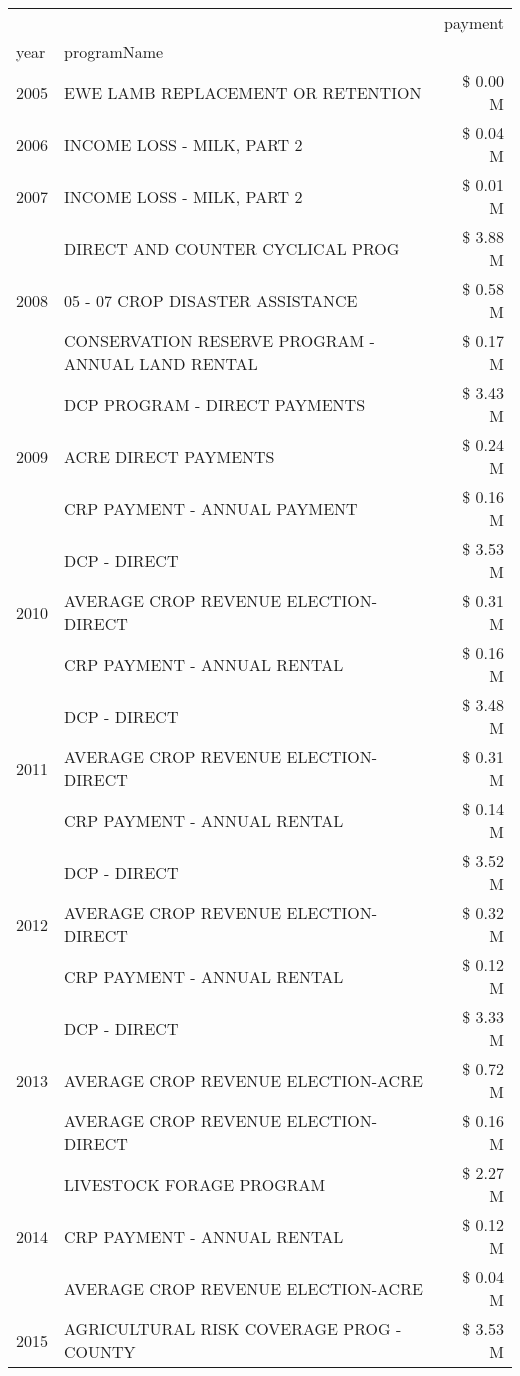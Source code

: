 \begin{tabular}{llr}
\toprule
 &  & payment \\
year & programName &  \\
\midrule
2005 & EWE LAMB REPLACEMENT OR RETENTION & \$ 0.00 M \\
\cline{1-3}
2006 & INCOME LOSS - MILK, PART 2 & \$ 0.04 M \\
\cline{1-3}
2007 & INCOME LOSS - MILK, PART 2 & \$ 0.01 M \\
\cline{1-3}
\multirow[t]{3}{*}{2008} & DIRECT AND COUNTER CYCLICAL PROG & \$ 3.88 M \\
 & 05 - 07 CROP DISASTER ASSISTANCE & \$ 0.58 M \\
 & CONSERVATION RESERVE PROGRAM - ANNUAL LAND RENTAL & \$ 0.17 M \\
\cline{1-3}
\multirow[t]{3}{*}{2009} & DCP PROGRAM - DIRECT PAYMENTS & \$ 3.43 M \\
 & ACRE DIRECT PAYMENTS & \$ 0.24 M \\
 & CRP PAYMENT - ANNUAL PAYMENT & \$ 0.16 M \\
\cline{1-3}
\multirow[t]{3}{*}{2010} & DCP - DIRECT & \$ 3.53 M \\
 & AVERAGE CROP REVENUE ELECTION-DIRECT & \$ 0.31 M \\
 & CRP PAYMENT - ANNUAL RENTAL & \$ 0.16 M \\
\cline{1-3}
\multirow[t]{3}{*}{2011} & DCP - DIRECT & \$ 3.48 M \\
 & AVERAGE CROP REVENUE ELECTION-DIRECT & \$ 0.31 M \\
 & CRP PAYMENT - ANNUAL RENTAL & \$ 0.14 M \\
\cline{1-3}
\multirow[t]{3}{*}{2012} & DCP - DIRECT & \$ 3.52 M \\
 & AVERAGE CROP REVENUE ELECTION-DIRECT & \$ 0.32 M \\
 & CRP PAYMENT - ANNUAL RENTAL & \$ 0.12 M \\
\cline{1-3}
\multirow[t]{3}{*}{2013} & DCP - DIRECT & \$ 3.33 M \\
 & AVERAGE CROP REVENUE ELECTION-ACRE & \$ 0.72 M \\
 & AVERAGE CROP REVENUE ELECTION-DIRECT & \$ 0.16 M \\
\cline{1-3}
\multirow[t]{3}{*}{2014} & LIVESTOCK FORAGE PROGRAM & \$ 2.27 M \\
 & CRP PAYMENT - ANNUAL RENTAL & \$ 0.12 M \\
 & AVERAGE CROP REVENUE ELECTION-ACRE & \$ 0.04 M \\
\cline{1-3}
\multirow[t]{3}{*}{2015} & AGRICULTURAL RISK COVERAGE PROG - COUNTY & \$ 3.53 M \\

\end{tabular}
